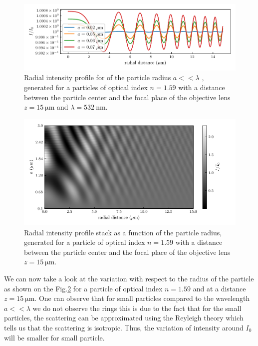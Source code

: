 \begin{figure}[H]
	\centering
	\includegraphics{02_body/chapter2/images/holo_size_exemple/smallparticles.pdf}
	\caption{Radial intensity profile for of the particle radius $a << \lambda$ , generated for a particles of optical index $n = 1.59$ with a distance between the particle center and the focal place of the objective lens $z = 15 ~\mathrm{\mu m}$ and $\lambda = 532 ~ \mathrm{nm}$.}
	\label{fig:small_part_holo}
\end{figure}



\begin{figure}
	\centering
	\includegraphics{02_body/chapter2/images/holo_size_exemple/holos_only_r.pdf}
	\caption{Radial intensity profile stack as a function of the particle radius, generated for a particle of optical index $n = 1.59$ with a distance between the particle center and the focal place of the objective lens $z = 15 ~\mathrm{\mu m}$.}
	\label{fig:holo_onlyr}
\end{figure}




We can now take a look at the variation with respect to the radius of the particle as shown on the Fig.\ref{fig:holo_onlyr} for a particle of optical index $n = 1.59$ and at a distance $z = 15 ~\mathrm{\mu m }$. One can observe that for small particles compared to the wavelength $a << \lambda$ we do not observe the rings this is due to the fact that for the small particles, the scattering can be approximated using the Reyleigh theory which tells us that the scattering is isotropic. Thus, the variation of intensity around $I_0$ will be smaller for small particle.

